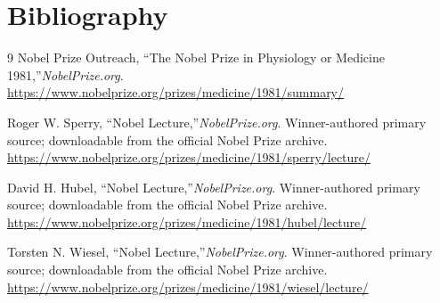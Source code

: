 \section{Bibliography}

\begin{thebibliography}{9}
Nobel Prize Outreach, ``The Nobel Prize in Physiology or Medicine 1981,''\emph{NobelPrize.org}.\\
\url{https://www.nobelprize.org/prizes/medicine/1981/summary/}

Roger W. Sperry, ``Nobel Lecture,''\emph{NobelPrize.org}. Winner-authored primary source; downloadable from the official Nobel Prize archive.\\
\url{https://www.nobelprize.org/prizes/medicine/1981/sperry/lecture/}

David H. Hubel, ``Nobel Lecture,''\emph{NobelPrize.org}. Winner-authored primary source; downloadable from the official Nobel Prize archive.\\
\url{https://www.nobelprize.org/prizes/medicine/1981/hubel/lecture/}

Torsten N. Wiesel, ``Nobel Lecture,''\emph{NobelPrize.org}. Winner-authored primary source; downloadable from the official Nobel Prize archive.\\
\url{https://www.nobelprize.org/prizes/medicine/1981/wiesel/lecture/}
\end{thebibliography}
